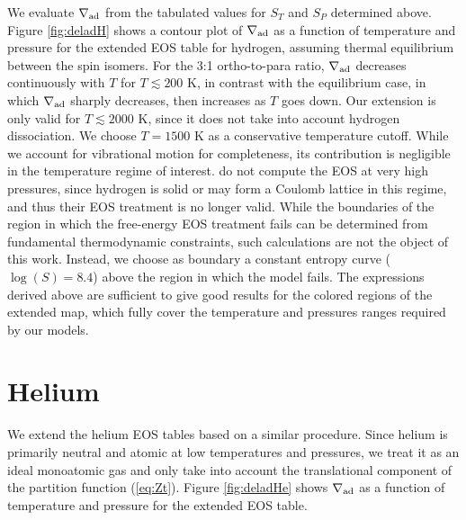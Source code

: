 \begin{enumerate}
We evaluate $\nabla_{\rm ad}$ from the tabulated values for $S_T$ and $S_P$ determined above. Figure \ref{fig:deladH} shows a contour plot of $\nabla_{\rm ad}$ as a function of temperature and pressure for the extended EOS table for hydrogen, assuming thermal equilibrium between the spin isomers. For the 3:1 ortho-to-para ratio, $\nabla_{\rm ad}$ decreases continuously with $T$ for $T \lesssim 200$ K, in contrast with the equilibrium case, in which $\nabla_{\rm ad}$ sharply decreases, then increases as $T$ goes down. Our extension is only valid for $T \lesssim 2000$ K, since it does not take into account hydrogen dissociation. We choose $T=1500$ K as a conservative temperature cutoff. While we account for vibrational motion for completeness, its contribution is negligible in the temperature regime of interest. \citet{saumon95} do not compute the EOS at very high pressures, since hydrogen is solid or may form a Coulomb lattice in this regime, and thus their EOS treatment is no longer valid. While the boundaries of the region in which the free-energy EOS treatment fails can be determined from fundamental thermodynamic constraints, such calculations are not the object of this work. Instead, we choose as boundary a constant entropy curve ($\log(S)=8.4$) above the region in which the \citet{saumon95} model fails. The expressions derived above are sufficient to give good results for the colored regions of the extended map, which fully cover the temperature and pressures ranges required by our models.


\end{enumerate}


\section{Helium}

We extend the helium EOS tables based on a similar procedure. Since helium is primarily neutral and atomic at low temperatures and pressures, we treat it as an ideal monoatomic gas and  only take into account the translational component of the partition function (\ref{eq:Zt}). Figure \ref{fig:deladHe} shows $\nabla_{\rm ad}$ as a function of temperature and pressure for the extended EOS table. %

